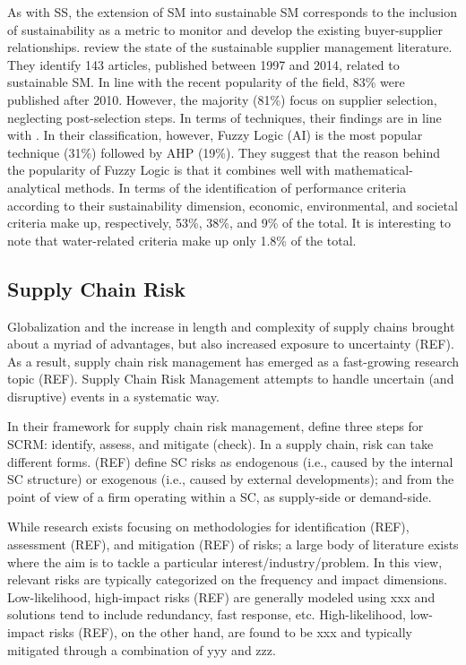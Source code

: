 \documentclass[a4paper]{article}
\begin{document}
As with SS, the extension of SM into sustainable SM corresponds to the inclusion of sustainability as a metric to monitor and develop the existing buyer-supplier relationships.
\citet{Zimmer:2015} review the state of the sustainable supplier management literature. 
They identify 143 articles, published between 1997 and 2014, related to sustainable SM.
In line with the recent popularity of the field,  83\%  were published after 2010.
However, the majority (81\%) focus on supplier selection, neglecting post-selection steps. 
In terms of techniques, their findings are in line with \citet{Chai:2013}.%
In their classification, however, Fuzzy Logic (AI) is the most popular technique (31\%) followed by AHP (19\%).
They suggest that the reason behind the popularity of Fuzzy Logic is that it combines well with mathematical-analytical methods.
In terms of the identification of performance criteria according to their sustainability dimension, economic, environmental, and societal criteria make up, respectively, 53\%, 38\%, and 9\% of the total.
It is interesting to note that water-related criteria make up only 1.8\% of the total.


\subsection{Supply Chain Risk}\label{lit:SCRM}

Globalization and the increase in length and complexity of supply chains brought about a myriad of advantages, but also increased exposure to uncertainty (REF). 
As a result, supply chain risk management has emerged as a fast-growing research topic (REF).
Supply Chain Risk Management attempts to handle uncertain (and disruptive) events in a systematic way.

In their framework for supply chain risk management, \citet{Sodhi:2012} define three steps for SCRM: identify, assess, and mitigate (check).
In a supply chain, risk can take different forms. 
(REF) define SC risks as endogenous (i.e., caused by the internal SC structure) or exogenous (i.e., caused by external developments); and from the point of view of a firm operating within a SC, as supply-side or demand-side. 

While research exists focusing on methodologies for identification (REF), assessment (REF), and mitigation (REF) of risks; a large body of literature exists where the aim is to tackle a particular interest/industry/problem.
In this view, relevant risks are typically categorized on the frequency and impact dimensions. 
Low-likelihood, high-impact risks (REF) are generally modeled using xxx and solutions tend to include redundancy, fast response, etc.
High-likelihood, low-impact risks (REF), on the other hand, are found to be xxx and typically mitigated through a combination of yyy and zzz. 
\end{document}
